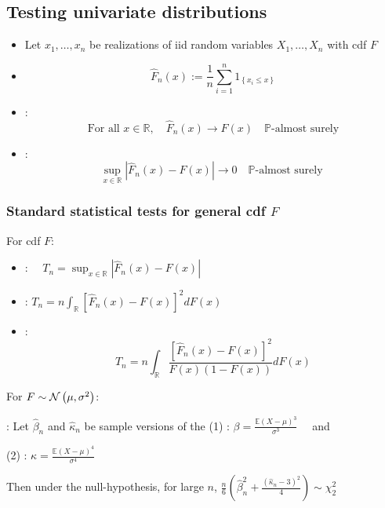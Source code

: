 \subsection*{Testing univariate distributions}
\begin{itemize}[leftmargin=*]
    \item Let $x_{1}, \ldots, x_{n}$ be realizations of iid random variables $X_{1}, \ldots, X_{n}$ with cdf $F$
    \item {}
$$
\hat{F}_{n}(x):=\frac{1}{n} \sum_{i=1}^{n} 1_{\left\{x_{i} \leq x\right\}}
$$
    \item {}:
$$
\text { For all } x \in \mathbb{R}, \quad \hat{F}_{n}(x) \rightarrow F(x) \quad \mathbb{P} \text {-almost surely }
$$
    \item {}:
$$
\sup _{x \in \mathbb{R}}\left|\hat{F}_{n}(x)-F(x)\right| \rightarrow 0 \quad \mathbb{P} \text {-almost surely }
$$
\end{itemize}





\subsubsection*{Standard statistical tests for general cdf $F$}
For  cdf $F$:
\begin{itemize}[leftmargin=*]
    \item {}: $\quad T_{n}=\sup _{x \in \mathbb{R}}\left|\hat{F}_{n}(x)-F(x)\right|$
    \item {}: $T_{n}=n \int_{\mathbb{R}}\left[\hat{F}_{n}(x)-F(x)\right]^{2} d F(x)$
    \item {}:
$$
T_{n}=n \int_{\mathbb{R}} \frac{\left[\hat{F}_{n}(x)-F(x)\right]^{2}}{F(x)(1-F(x))} d F(x)
$$
\end{itemize}
For  $F \sim \operatorname{\mathcal{N}}\left(\mu, \sigma^{2}\right)$:

: Let $\hat{\beta}_{n}$ and $\hat{\kappa}_{n}$ be sample versions of the 
(1) : $\beta=\frac{\mathbb{E}(X-\mu)^{3}}{\sigma^{3}} \quad$ and 

(2) : $\kappa=\frac{\mathbb{E}(X-\mu)^{4}}{\sigma^{4}}$


Then under the null-hypothesis, for large $n$,
$\frac{n}{6}\left(\hat{\beta}_{n}^{2}+\frac{\left(\hat{\kappa}_{n}-3\right)^{2}}{4}\right) \sim \chi_{2}^{2} \quad$

